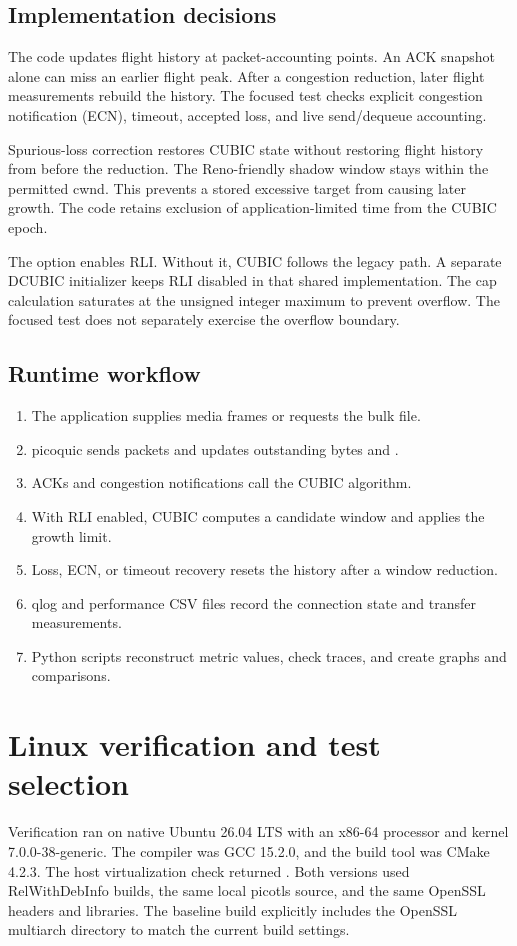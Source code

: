 \documentclass[11pt,a4paper]{article}
\newcommand{\code}[1]{\texttt{\detokenize{#1}}}
\begin{document}
\subsection{Implementation decisions}
The code updates flight history at packet-accounting points.
An ACK snapshot alone can miss an earlier flight peak.
After a congestion reduction, later flight measurements rebuild the history.
The focused test checks explicit congestion notification (ECN), timeout, accepted loss, and live send/dequeue accounting.

Spurious-loss correction restores CUBIC state without restoring flight history from before the reduction.
The Reno-friendly shadow window stays within the permitted cwnd.
This prevents a stored excessive target from causing later growth.
The code retains exclusion of application-limited time from the CUBIC epoch.

The option \code{-G cubic -H rli=on} enables RLI.
Without it, CUBIC follows the legacy path.
A separate DCUBIC initializer keeps RLI disabled in that shared implementation.
The cap calculation saturates at the unsigned integer maximum to prevent overflow.
The focused test does not separately exercise the overflow boundary.

\subsection{Runtime workflow}
\begin{enumerate}
\item The application supplies media frames or requests the bulk file.
\item picoquic sends packets and updates outstanding bytes and \code{maxFS}.
\item ACKs and congestion notifications call the CUBIC algorithm.
\item With RLI enabled, CUBIC computes a candidate window and applies the growth limit.
\item Loss, ECN, or timeout recovery resets the history after a window reduction.
\item qlog and performance CSV files record the connection state and transfer measurements.
\item Python scripts reconstruct metric values, check traces, and create graphs and comparisons.
\end{enumerate}

\section{Linux verification and test selection}
Verification ran on native Ubuntu 26.04 LTS with an x86-64 processor and kernel 7.0.0-38-generic.
The compiler was GCC 15.2.0, and the build tool was CMake 4.2.3.
The host virtualization check returned \code{none}.
Both versions used RelWithDebInfo builds, the same local picotls source, and the same OpenSSL headers and libraries.
The baseline build explicitly includes the OpenSSL multiarch directory to match the current build settings.
\end{document}
